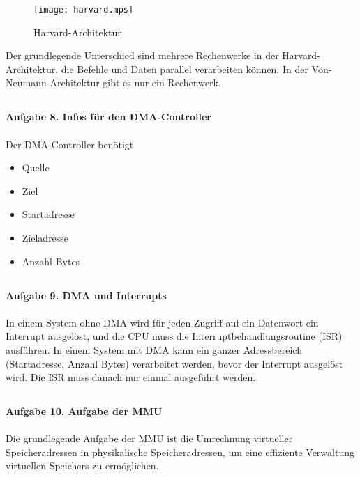 \documentclass{article}
\begin{document}
\begin{figure}[h]
  \texttt{[image: harvard.mps]}
  \caption{Harvard-Architektur}
\end{figure}

Der grundlegende Unterschied sind mehrere Rechenwerke in der Harvard-Architektur, die Befehle und Daten parallel verarbeiten können. In der Von-Neumann-Architektur gibt es nur ein Rechenwerk.

\subsection*{}
\textbf{Aufgabe 8. Infos für den DMA-Controller} \\ \\
Der DMA-Controller benötigt
\renewcommand{\labelitemi}{\textendash}
\begin{itemize}
  \item {Quelle}
  \item {Ziel}
  \item {Startadresse}
  \item {Zieladresse}
  \item {Anzahl Bytes}
\end{itemize}

\subsection*{}
\textbf{Aufgabe 9. DMA und Interrupts} \\ \\
In einem System ohne DMA wird für jeden Zugriff auf ein Datenwort ein Interrupt ausgelöst, und die CPU muss die Interruptbehandlungsroutine (ISR) ausführen. In einem System mit DMA kann ein ganzer Adressbereich (Start\-adresse, Anzahl Bytes) verarbeitet werden, bevor der Interrupt ausgelöst wird. Die ISR muss danach nur einmal ausgeführt werden.

\subsection*{}
\textbf{Aufgabe 10. Aufgabe der MMU} \\ \\
Die grundlegende Aufgabe der MMU ist die Umrechnung virtueller Speicheradressen in physikalische Speicheradressen, um eine effiziente Verwaltung virtuellen Speichers zu ermöglichen.
\end{document}

